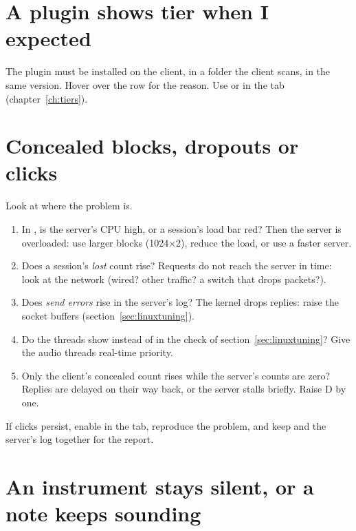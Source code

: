 \section{A plugin shows tier  when I expected }

The plugin must be installed on the client, in a folder the client scans, in
the same version. Hover over the row for the reason. Use  or
 in the  tab (chapter~\ref{ch:tiers}).

\section{Concealed blocks, dropouts or clicks}

Look at where the problem is.

\begin{enumerate}
  \item In , is the server's CPU high, or a session's load bar
    red? Then the server is overloaded: use larger blocks (1024$\times$2),
    reduce the load, or use a faster server.
  \item Does a session's \emph{lost} count rise? Requests do not reach the
    server in time: look at the network (wired? other traffic? a switch
    that drops packets?).
  \item Does \emph{send errors} rise in the server's log? The kernel drops
    replies: raise the socket buffers (section~\ref{sec:linuxtuning}).
  \item Do the threads show  instead of  in the check of
    section~\ref{sec:linuxtuning}? Give the audio threads real-time priority.
  \item Only the client's concealed count rises while the server's counts are
    zero? Replies are delayed on their way back, or the server stalls
    briefly. Raise D by one.
\end{enumerate}

If clicks persist, enable  in the 
tab, reproduce the problem, and keep  and the
server's log together for the report.

\section{An instrument stays silent, or a note keeps sounding}

